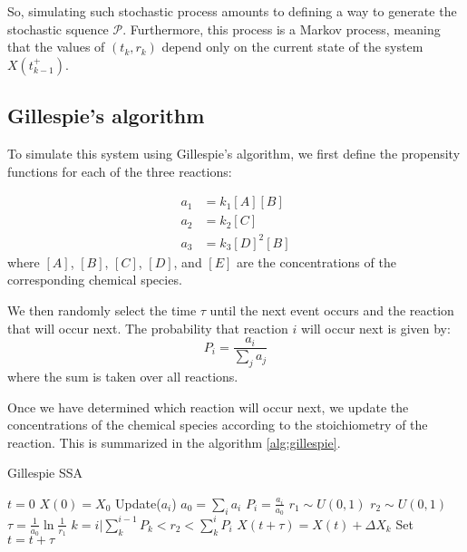 So, simulating such stochastic process amounts to defining a way to generate the stochastic squence $\mathcal P$. Furthermore, this process is a Markov process, meaning that the values of $(t_k, r_k)$ depend only on the current state of the system $X(t_{k-1}^+)$.

\subsection{Gillespie's algorithm}

To simulate this system using Gillespie's algorithm, we first define the propensity functions for each of the three reactions:

\begin{align}
a_1 &= k_1 [A][B] \\
a_2 &= k_2 [C] \\
a_3 &= k_3 [D]^2 [B]
\end{align}
where $[A]$, $[B]$, $[C]$, $[D]$, and $[E]$ are the concentrations of the corresponding chemical species.

We then randomly select the time $\tau$ until the next event occurs and the reaction that will occur next. The probability that reaction $i$ will occur next is given by:
\begin{equation}
P_i = \frac{a_i}{\sum_j a_j}
\end{equation}
where the sum is taken over all reactions.

Once we have determined which reaction will occur next, we update the concentrations of the chemical species according to the stoichiometry of the reaction. This is summarized in the algorithm \ref{alg:gillespie}.
\begin{algorithm}{Gillespie SSA}
\begin{algorithmic}[1]
\State $t = 0$
\State $X(0) = X_0$ 
    \State Update($a_i$) 
    \State $a_0 = \sum_i a_i$ 
    \State $P_i = \frac{a_i}{a_0}$ 
    \EndFor
    \State $r_1 \sim U(0,1) $ 
    \State $r_2 \sim U(0,1) $    
    \State $\tau = \frac{1}{a_0} \ln\frac{1}{r_1}$ 
    \State $k = i | \sum_k^{i-1} P_k < r_2 <\sum_k^i P_{i}$ 
    \State $X(t+\tau) = X(t) + \Delta X_k$
    \State Set $t = t + \tau$
\EndWhile
\end{algorithmic}
\label{alg:gillespie}
\caption{}
\end{algorithm}

